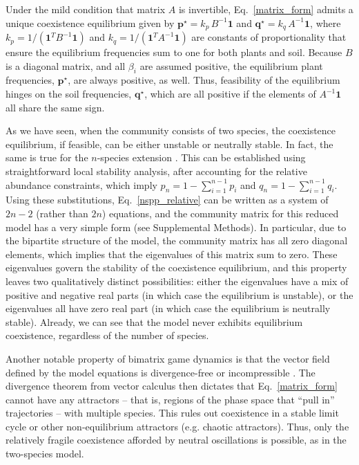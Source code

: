 \documentclass[11pt]{article}
\begin{document}
Under the mild condition that matrix $A$ is invertible, Eq.~\ref{matrix_form} admits a unique coexistence equilibrium given by $\bm{p}^\star = k_p \, B^{-1} \bm{1}$ and $\bm{q}^\star = k_q \, A^{-1} \bm{1}$, where $k_p = 1 / (\bm{1}^T B^{-1} \bm{1})$ and $k_q = 1 / (\bm{1}^T A^{-1} \bm{1})$ are constants of proportionality that ensure the equilibrium frequencies sum to one for both plants and soil. Because $B$ is a diagonal matrix, and all $\beta_i$ are assumed positive, the equilibrium plant frequencies, $\bm{p}^\star$, are always positive, as well. Thus, feasibility of the equilibrium hinges on the soil frequencies, $\bm{q}^\star$, which are all positive if the elements of $A^{-1} \bm{1}$ all share the same sign.

As we have seen, when the community consists of two species, the coexistence equilibrium, if feasible, can be either unstable or neutrally stable. In fact, the same is true for the $n$-species extension  \citep[and, more generally, for any bimatrix game dynamics,][]{eshel1983coevolutionary,selten1988note,hofbauer1998evolutionary}. This can be established using straightforward local stability analysis, after accounting for the relative abundance constraints, which imply $p_n = 1 - \sum_{i = 1}^{n-1} p_i$ and $q_n = 1 - \sum_{i = 1}^{n-1} q_i$. Using these substitutions, Eq.~\ref{nspp_relative} can be written as a system of $2 n - 2$ (rather than $2 n$) equations, and the community matrix for this reduced model has a very simple form (see Supplemental Methods). In particular, due to the bipartite structure of the model, the community matrix has all zero diagonal elements, which implies that the eigenvalues of this matrix sum to zero. These eigenvalues govern the stability of the coexistence equilibrium, and this property leaves two qualitatively distinct possibilities: either the eigenvalues have a mix of positive and negative real parts (in which case the equilibrium is unstable), or the eigenvalues all have zero real part (in which case the equilibrium is neutrally stable). Already, we can see that the model never exhibits equilibrium coexistence, regardless of the number of species.

Another notable property of bimatrix game dynamics is that the vector field defined by the model equations is divergence-free or incompressible \citep[see][for a proof]{hofbauer1998evolutionary}. The divergence theorem from vector calculus \citep{arfken1985mathematical} then dictates that Eq.~\ref{matrix_form} cannot have any attractors -- that is, regions of the phase space that ``pull in'' trajectories -- with multiple species. This rules out coexistence in a stable limit cycle or other non-equilibrium attractors (e.g. chaotic attractors). Thus, only the relatively fragile coexistence afforded by neutral oscillations is possible, as in the two-species model.
\end{document}
